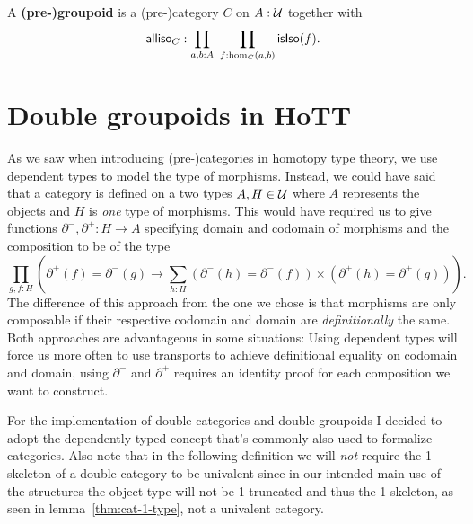\begin{defn}
A \textbf{(pre-)groupoid} is a (pre-)category $C$ on $A : \mathcal{U}$ together with
\begin{equation*}
\mathsf{alliso}_C : \prod_{a,b:A} ~ \prod_{f:\hom_C(a,b)} \mathsf{isIso}(f) \text{.}
\end{equation*}
\end{defn}

\section{Double groupoids in HoTT}

As we saw when introducing (pre-)categories in homotopy type theory, we use
dependent types to model the type of morphisms. Instead, we could have said that
a category is defined on a two types $A, H \in \mathcal{U}$ where $A$ represents the objects
and $H$ is \emph{one} type of morphisms.
This would have required us to give functions $\partial^-, \partial^+ : H \to A$
specifying domain and codomain of morphisms and the composition to be of the type
\begin{equation*}
\prod_{g,f:H} \left(\partial^+(f) = \partial^-(g) \to 
	\sum_{h:H} \left(\partial^-(h)=\partial^-(f)\right)
		\times \left(\partial^+(h)=\partial^+(g) \right) \right) \text{.}
\end{equation*}
The difference of this approach from the one we chose is that morphisms are only
composable if their respective codomain and domain are \emph{definitionally}
the same. Both approaches are advantageous in some situations:
Using dependent types will force us more often to use transports to achieve
definitional equality on codomain and domain, using $\partial^-$ and $\partial^+$
requires an identity proof for each composition we want to construct.

For the implementation of double categories and double groupoids I decided to
adopt the dependently typed concept that's commonly also used to formalize categories.
Also note that in the following definition we will \emph{not} require the
1-skeleton of a double category to be univalent since in our intended main
use of the structures the object type will not be 1-truncated and thus the
1-skeleton, as seen in lemma~\ref{thm:cat-1-type}, not a univalent category.

